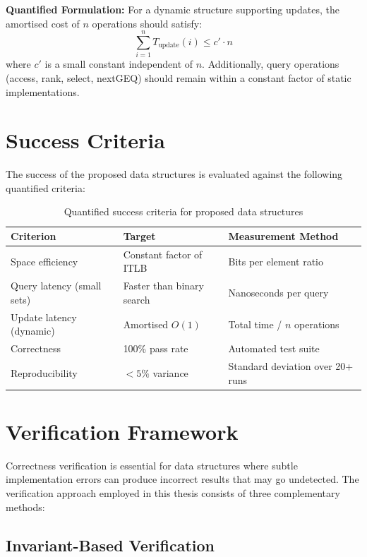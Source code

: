 \textbf{Quantified Formulation:} For a dynamic structure supporting updates, the amortised cost of $n$ operations should satisfy:
\begin{equation}
    \sum_{i=1}^{n} T_{\text{update}}(i) \leq c' \cdot n
\end{equation}
where $c'$ is a small constant independent of $n$. Additionally, query operations (access, rank, select, nextGEQ) should remain within a constant factor of static implementations.

\section{Success Criteria}

The success of the proposed data structures is evaluated against the following quantified criteria:

\begin{table}[H]
\centering
\begin{tabular}{|l|l|l|}
\hline
\textbf{Criterion} & \textbf{Target} & \textbf{Measurement Method} \\
\hline
Space efficiency & Constant factor of ITLB & Bits per element ratio \\
Query latency (small sets) & Faster than binary search & Nanoseconds per query \\
Update latency (dynamic) & Amortised $O(1)$ & Total time / $n$ operations \\
Correctness & 100\% pass rate & Automated test suite \\
Reproducibility & $< 5\%$ variance & Standard deviation over 20+ runs \\
\hline
\end{tabular}
\caption{Quantified success criteria for proposed data structures}
\label{tab:success-criteria}
\end{table}

\section{Verification Framework}

Correctness verification is essential for data structures where subtle implementation errors can produce incorrect results that may go undetected. The verification approach employed in this thesis consists of three complementary methods:

\subsection{Invariant-Based Verification}

